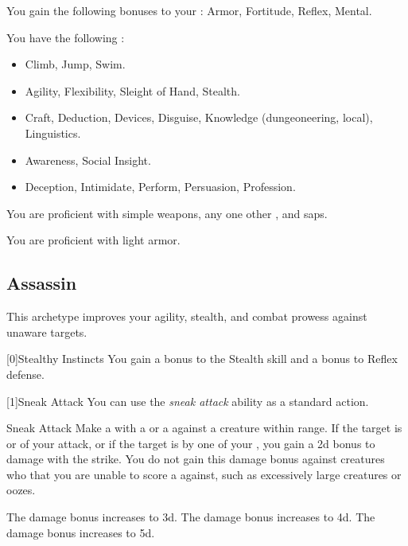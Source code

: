         You gain the following bonuses to your :  Armor,  Fortitude,  Reflex,  Mental.

        You have the following :
        \begin{itemize}
            \item {} Climb, Jump, Swim.
            \item {} Agility, Flexibility, Sleight of Hand, Stealth.
            \item {} Craft, Deduction, Devices, Disguise, Knowledge (dungeoneering, local), Linguistics.
            \item {} Awareness, Social Insight.
            \item {} Deception, Intimidate, Perform, Persuasion, Profession.
        \end{itemize}

        You are proficient with simple weapons, any one other , and saps.

        You are proficient with light armor.

    \newpage
    \subsection{Assassin}
        This archetype improves your agility, stealth, and combat prowess against unaware targets.

        [0]{Stealthy Instincts} You gain a  bonus to the Stealth skill and a  bonus to Reflex defense.

        [1]{Sneak Attack}
        You can use the \textit{sneak attack} ability as a standard action.
        \begin{freeability}{Sneak Attack}
            Make a  with a  or a  against a creature within \rngshort range.
            If the target is  or  of your attack, or if the target is  by one of your , you gain a \plus2d bonus to damage with the strike.
            You do not gain this damage bonus against creatures who that you are unable to score a  against, such as excessively large creatures or oozes.

            \rankline
             The damage bonus increases to \plus3d.
             The damage bonus increases to \plus4d.
             The damage bonus increases to \plus5d.
        \end{freeability}

